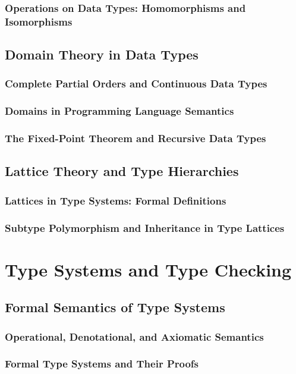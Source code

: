 \documentclass[12pt, oneside]{book}
\begin{document}
\subsubsection{Operations on Data Types: Homomorphisms and Isomorphisms}
\subsection{Domain Theory in Data Types}
\subsubsection{Complete Partial Orders and Continuous Data Types}
\subsubsection{Domains in Programming Language Semantics}
\subsubsection{The Fixed-Point Theorem and Recursive Data Types}
\subsection{Lattice Theory and Type Hierarchies}
\subsubsection{Lattices in Type Systems: Formal Definitions}
\subsubsection{Subtype Polymorphism and Inheritance in Type Lattices}

\section{Type Systems and Type Checking}
\subsection{Formal Semantics of Type Systems}
\subsubsection{Operational, Denotational, and Axiomatic Semantics}
\subsubsection{Formal Type Systems and Their Proofs}
\end{document}
